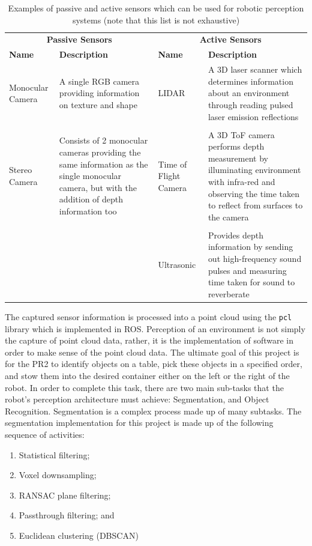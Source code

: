 \documentclass[a4paper]{article}
\begin{document}
\begin{table}[h]
\centering
\caption{Examples of passive and active sensors which can be used for robotic perception systems (note that this list is not exhaustive)}
\begin{tabular}{p{2.3cm}p{4.5cm}p{2.3cm}p{4.5cm}}
\toprule
\multicolumn{2}{c}{\textbf{Passive Sensors}} & \multicolumn{2}{c}{\textbf{Active Sensors}}\\
\cmidrule(lr){1-2} \cmidrule(lr){3-4}
\textbf{Name} & \textbf{Description} & \textbf{Name} & \textbf{Description}\\
\midrule
Monocular Camera & A single RGB camera providing information on texture and shape & LIDAR & A 3D laser scanner which determines information about an environment through reading pulsed laser emission reflections\\
& & & \\
Stereo Camera & Consists of 2 monocular cameras providing the same information as the single monocular camera, but with the addition of depth information too & Time of Flight Camera & A 3D ToF camera performs depth measurement by illuminating environment with infra-red and observing the time taken to reflect from surfaces to the camera\\
& & & \\
& & Ultrasonic & Provides depth information by sending out high-frequency sound pulses and measuring time taken for sound to reverberate\\
\bottomrule
\end{tabular}
\end{table}

The captured sensor information is processed into a point cloud using the \verb|pcl| library which is implemented in ROS. Perception of an environment is not simply the capture of point cloud data, rather, it is the implementation of software in order to make sense of the point cloud data. The ultimate goal of this project is for the PR2 to identify objects on a table, pick these objects in a specified order, and stow them into the desired container either on the left or the right of the robot. In order to complete this task, there are two main sub-tasks that the robot's perception architecture must achieve: Segmentation, and Object Recognition. Segmentation is a complex process made up of many subtasks. The segmentation implementation for this project is made up of the following sequence of activities:
\begin{enumerate}
\item Statistical filtering;
\item Voxel downsampling;
\item RANSAC plane filtering;
\item Passthrough filtering; and
\item Euclidean clustering (DBSCAN)
\end{enumerate}
\end{document}
